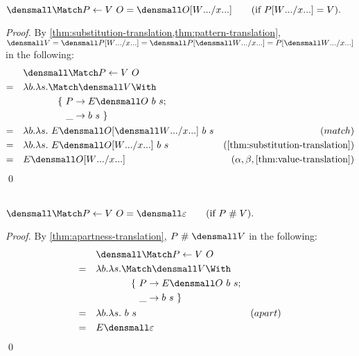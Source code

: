 \begin{lemma}
  \label{thm:try-match}
  \\
  $\den{\Match P \gets V ~ O} = \den{O\subst{\many{x}}{\many{W}}}
  \qquad (\text{if } P\subst{\many{x}}{\many{W}} = V).$
\end{lemma}
\begin{proof}
  By \cref{thm:substitution-translation,thm:pattern-translation},
  \begin{math}
    \den{V}
    =
    \den{P\subst{\many{x}}{\many{W}}}
    =
    \den{P}\subst{\many{x}}{\many{\den{W}}}
    =
    P\subst{\many{x}}{\many{\den{W}}}
  \end{math}
  in the following:
  \begin{align*}
    &\quad \den{\Match P \gets V ~ O}  \\
    =&\quad \lambda b. \lambda s.
    \begin{aligned}[t]
      &\Match \den{V} \With \\
      &\quad
      \begin{aligned}[t]
        \{~
        P &\to E\den{O}~b~s; \\
        \_ &\to b~s
        ~\}
      \end{aligned}
    \end{aligned}  \\
    =&\quad  \lambda b. \lambda s.~E\den{O}\subst{\many{x}}{\many{\den{W}}}~b~s  & (match) \\
    =& \quad \lambda b. \lambda s.~E\den{O\subst{\many{x}}{\many{W}}}~b~s & (\cref{thm:substitution-translation})
    \\
    =& \quad E\den{O\subst{\many{x}}{\many{W}}} & (\alpha, \beta, \cref{thm:value-translation})
  \end{align*}
  \qed
\end{proof}

\begin{lemma}
  \label{thm:try-match-apart}
  \\
  $\den{\Match P \gets V ~ O} = \den{\varepsilon}
  \qquad (\text{if } P \apart V).$
\end{lemma}
\begin{proof}
  By \cref{thm:apartness-translation}, $P \apart \den{V}$ in the following:
  \begin{align*}
    &\quad \den{\Match P \gets V ~ O}  \\
    =&\quad \lambda b. \lambda s.
    \begin{aligned}[t]
      &\Match \den{V} \With \\
      &\quad
      \begin{aligned}[t]
        \{~
        P &\to E\den{O}~b~s; \\
        \_ &\to b~s
        ~\}
      \end{aligned}
    \end{aligned}  \\
    =&\quad  \lambda b. \lambda s.~b~s  & (apart) \\
    =& \quad E\den{\varepsilon}
  \end{align*}
  \qed
\end{proof}


